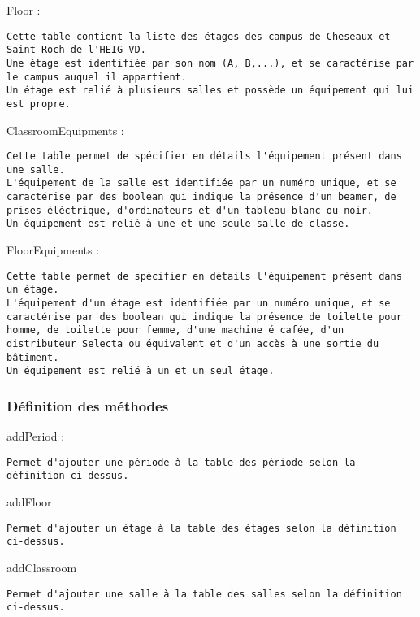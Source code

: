 \documentclass[12pt]{article}
\begin{document}
Floor :

\begin{verbatim}
Cette table contient la liste des étages des campus de Cheseaux et Saint-Roch de l'HEIG-VD.
Une étage est identifiée par son nom (A, B,...), et se caractérise par le campus auquel il appartient.
Un étage est relié à plusieurs salles et possède un équipement qui lui est propre.
\end{verbatim}

ClassroomEquipments :

\begin{verbatim}
Cette table permet de spécifier en détails l'équipement présent dans une salle.
L'équipement de la salle est identifiée par un numéro unique, et se caractérise par des boolean qui indique la présence d'un beamer, de prises éléctrique, d'ordinateurs et d'un tableau blanc ou noir.
Un équipement est relié à une et une seule salle de classe.
\end{verbatim}

FloorEquipments :

\begin{verbatim}
Cette table permet de spécifier en détails l'équipement présent dans un étage.
L'équipement d'un étage est identifiée par un numéro unique, et se caractérise par des boolean qui indique la présence de toilette pour homme, de toilette pour femme, d'une machine é cafée, d'un distributeur Selecta ou équivalent et d'un accès à une sortie du bâtiment.
Un équipement est relié à un et un seul étage.
\end{verbatim}

\hypertarget{header-n24}{%
\subsubsection{Définition des méthodes}\label{header-n24}}

addPeriod :

\begin{verbatim}
Permet d'ajouter une période à la table des période selon la définition ci-dessus.
\end{verbatim}

addFloor

\begin{verbatim}
Permet d'ajouter un étage à la table des étages selon la définition ci-dessus.
\end{verbatim}

addClassroom

\begin{verbatim}
Permet d'ajouter une salle à la table des salles selon la définition ci-dessus.
\end{verbatim}
\end{document}
